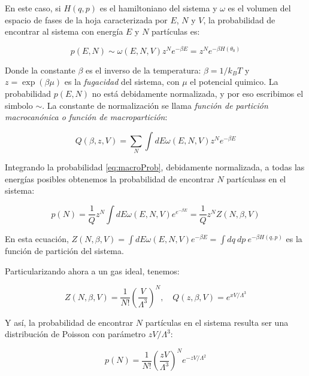 \documentclass[11pt, a4paper]{article} %
\theoremstyle{named}
\begin{document}
En este caso, si $H(q,p)$ es el hamiltoniano del sistema y $\omega$ es el volumen del espacio de fases de la hoja caracterizada por $E$, $N$ y $V$, la probabilidad de encontrar al sistema con energía $E$ y $N$ partículas es:

\begin{equation}\label{eq:macroProb}
p(E, N) \sim \omega(E, N, V) z^{N} e^{-\beta E}=z^{N} e^{-\beta H\left(\theta_{0}\right)}
\end{equation}

Donde la constante $\beta$ es el inverso de la temperatura: $\beta=1 / k_{B} T$ y $z=\exp (\beta \mu)$ es la \textit{fugacidad} del sistema, con $\mu$ el potencial quimico. La probabilidad $p(E, N)$ no está debidamente normalizada, y por eso escribimos el simbolo $\sim$. La constante de normalización se llama \textit{función de partición macrocanónica o función de macropartición}:

\begin{equation}
    Q(\beta, z, V)=\sum_{N} \int d E \omega(E, N, V) z^{N} e^{-\beta E}
\end{equation}

Integrando la probabilidad \eqref{eq:macroProb}, debidamente normalizada, a todas las energías posibles obtenemos la probabilidad de encontrar $N$ partículass en el sistema:

\begin{equation}
    p(N)=\frac{1}{Q} z^{N} \int d E \omega(E, N, V) e^{e^{-\beta E}}=\frac{1}{Q} z^{N} Z(N, \beta, V)
\end{equation}

En esta ecuación, $Z(N, \beta, V)=\int d E \omega(E, N, V) e^{-\beta E}=\int d q \ d p \ e^{-\beta H(q,p)}$ es la función de partición del sistema.

Particularizando ahora a un gas ideal, tenemos:

\begin{equation}
Z(N, \beta, V)=\frac{1}{N !}\left(\frac{V}{\Lambda^{3}}\right)^{N}, \quad Q(z, \beta, V)=e^{x V / \Lambda^{3}}
\end{equation}

Y así, la probabilidad de encontrar $N$ partículas en el sistema resulta ser una distribución de Poisson con parámetro $zV / \Lambda^3$:

\begin{equation}\label{eq:macroPoiss}
    p(N)=\frac{1}{N !}\left(\frac{z V}{\Lambda^{3}}\right)^{N} e^{-z V / \Lambda^{2}}
\end{equation}
\end{document}
